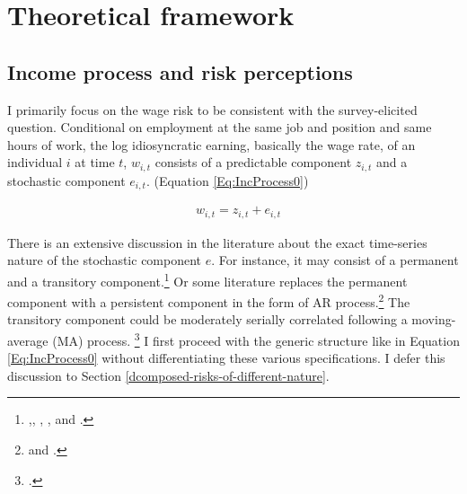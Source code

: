 
    \hypertarget{theoretical-framework}{%
\section{Theoretical framework}\label{theoretical-framework}}

\hypertarget{income-process-and-risk-perceptions}{%
\subsection{Income process and risk
perceptions}\label{income-process-and-risk-perceptions}}

I primarily focus on the wage risk to be consistent with the survey-elicited question. Conditional on employment at the same job and position and same hours of work, the log idiosyncratic earning, basically the wage rate, of an individual \(i\) at time \(t\), $w_{i,t}$ consists of a predictable component $z_{i,t}$ and a stochastic component $e_{i,t}$. (Equation \ref{Eq:IncProcess0}) %


\begin{equation}
\begin{split}
\label{Eq:IncProcess0}
& w_{i,t} = z_{i,t}+ e_{i,t} 
\end{split}
\end{equation}

There is an extensive discussion in the literature about the exact time-series nature of the stochastic component $e$. For instance, it may consist of a permanent and a transitory component.\footnote{\cite{abowd1989covariance},\cite{gottschalk1994growth}, \cite{carroll1997nature}, \cite{blundell_consumption_2008}, and \cite{kaplan2010much}.} Or some literature replaces the permanent component with a persistent component in the form of AR process.\footnote{\cite{storesletten2004cyclical} and \cite{guvenen_empirical_2009}.} The transitory component could be moderately serially correlated following a moving-average (MA) process. \footnote{\cite{meghir2004income}.} I first proceed with the generic structure like in Equation \ref{Eq:IncProcess0} without differentiating these various specifications. I defer this discussion to Section \ref{dcomposed-risks-of-different-nature}. 


